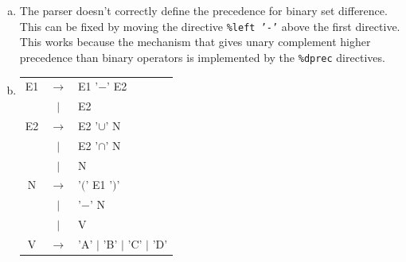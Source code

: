 \documentclass[11pt]{article}
\begin{document}
\begin{enumerate}[(a)]
\item The parser doesn't correctly define the precedence for binary set difference. This can be fixed by moving the directive \texttt{\%left '-'} above the first directive. This works because the mechanism that gives unary complement higher precedence than binary operators is implemented by the \texttt{\%dprec} directives.
\item \begin{tabular}{ccl}
E1 & $\to$  & E1 '$-$' E2\\
   & $\mid$ & E2\\
E2 & $\to$  & E2 '$\cup$' N\\
   & $\mid$ & E2 '$\cap$' N\\
   & $\mid$ & N\\
N  & $\to$  & '$($' E1 '$)$'\\
   & $\mid$ & '$-$' N\\
   & $\mid$ & V\\
V  & $\to$  & 'A' $\mid$ 'B' $\mid$ 'C' $\mid$ 'D'
\end{tabular}
\end{enumerate}
\end{document}
